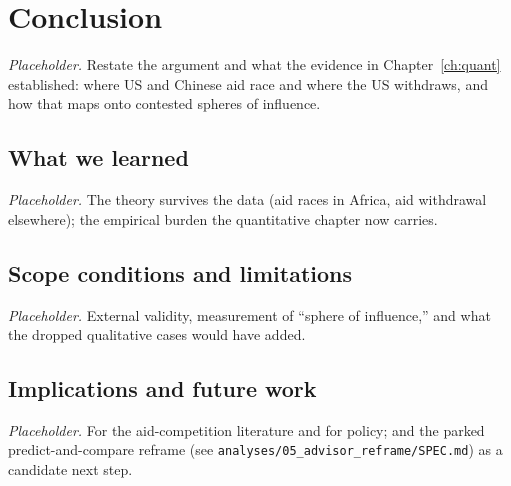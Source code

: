 \chapter{Conclusion}
\label{ch:conclusion}

\textit{Placeholder.} Restate the argument and what the evidence in
Chapter~\ref{ch:quant} established: where US and Chinese aid race and where the
US withdraws, and how that maps onto contested spheres of influence.

\section{What we learned}
\textit{Placeholder.} The theory survives the data (aid races in Africa, aid
withdrawal elsewhere); the empirical burden the quantitative chapter now carries.

\section{Scope conditions and limitations}
\textit{Placeholder.} External validity, measurement of ``sphere of influence,''
and what the dropped qualitative cases would have added.

\section{Implications and future work}
\textit{Placeholder.} For the aid-competition literature and for policy; and the
parked predict-and-compare reframe (see
\texttt{analyses/05\_advisor\_reframe/SPEC.md}) as a candidate next step.
